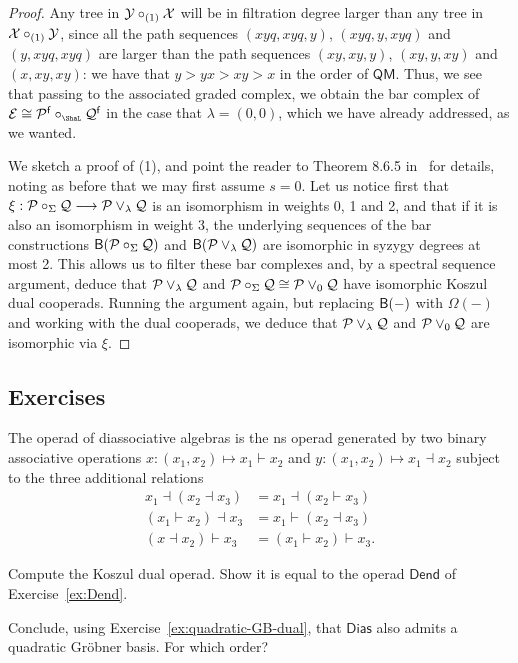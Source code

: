 \begin{proof}
Any tree in $\mathcal{Y}\circ_{(1)}\mathcal{X}$ will be
in filtration degree larger than any tree
in $\mathcal{X}\circ_{(1)}\mathcal{Y}$, since all the path 
sequences
$(xyq,xyq,y)$, $(xyq,y,xyq)$ and $(y,xyq,xyq)$
are larger than the path sequences 
$(xy,xy,y)$, $(xy,y,xy)$ and $(x,xy,xy)$:
we have that $y > yx > xy > x$ in the order of 
$\mathsf{QM}$. Thus, we see that passing
to the associated graded complex, we obtain
the bar complex of $\mathcal E\cong \PP^\f\circ_\Sha\QQ^\f$
in the case that $\lambda = (0,0)$, which
we have already addressed, as we wanted. 

We sketch a proof of (1), and point
the reader to Theorem 8.6.5 in~\cite{Loday2012}
for details, noting as before that we
may first assume $s=0$.
Let us notice first that
$\xi: {\mathcal{P}}\circ_\Sigma\mathcal{Q}\longrightarrow
 {\mathcal{P}}\vee_\lambda \mathcal{Q}$ is an isomorphism in
 weights 0, 1 and 2, and that if it is also
 an isomorphism in weight 3, the underlying
 sequences of the bar
 constructions $\mathsf{B}({\mathcal{P}}\circ_\Sigma\mathcal{Q})$
 and $\mathsf{B}({\mathcal{P}}\vee_\lambda \mathcal{Q})$ are isomorphic
 in syzygy degrees at most 2. This allows us
 to filter these bar complexes and, by a 
 spectral sequence argument, deduce that
 ${\mathcal{P}}\vee_\lambda \mathcal{Q}$ and ${\mathcal{P}}\circ_\Sigma\mathcal{Q}\cong
  {\mathcal{P}}\vee_0 \mathcal{Q}$ have isomorphic Koszul dual
 cooperads. Running the argument again, but
 replacing $\mathsf{B}(-)$ with $\Omega(-)$ and 
 working with the dual cooperads, we deduce
 that  ${\mathcal{P}}\vee_\lambda \mathcal{Q}$ and ${\mathcal{P}}\vee_0 \mathcal{Q}$ are isomorphic via $\xi$.
\end{proof}
\newpage


\subsection{Exercises}

\begin{question}
The operad of diassociative algebras is the
ns operad generated by two binary 
associative operations
$x: (x_1,x_2) \longmapsto x_1\vdash x_2$ and
$y: (x_1,x_2) \longmapsto x_1\dashv x_2$ subject
to the three additional relations
\begin{align*}
 x_1 \dashv (x_2 \dashv x_3) &= x_1 \dashv (x_2 \vdash x_3) \\
 (x_1 \vdash x_2) \dashv x_3 &= x_1 \vdash (x_2 \dashv x_3) \\
(x \dashv x_2) \vdash x_3 &= (x_1 \vdash x_2) \vdash x_3.
\end{align*}
\begin{tenumerate}
\item Compute the Koszul dual operad. Show
it is equal to the operad $\mathsf{Dend}$
of Exercise~\ref{ex:Dend}.
\item Conclude, using Exercise~\ref{ex:quadratic-GB-dual}, that $\mathsf{Dias}$ also admits
a quadratic Gr\"obner basis. For which
order?
\end{tenumerate}
\end{question}

